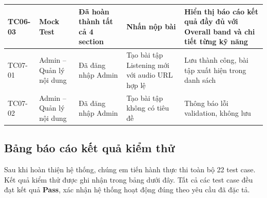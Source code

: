 \documentclass[a4paper,12pt]{extreport}
\begin{document}
\begin{longtable}{|p{1.3cm}|p{2.8cm}|p{2.8cm}|p{4.0cm}|p{3.0cm}|}
    TC06-03 & Mock Test & Đã hoàn thành tất cả 4 section & Nhấn nộp bài & Hiển thị báo cáo kết quả đầy đủ với Overall band và chi tiết từng kỹ năng \\ \hline

    TC07-01 & Admin -- Quản lý nội dung & Đã đăng nhập Admin & Tạo bài tập Listening mới với audio URL hợp lệ & Lưu thành công, bài tập xuất hiện trong danh sách \\ \hline

    TC07-02 & Admin -- Quản lý nội dung & Đã đăng nhập Admin & Tạo bài tập không có tiêu đề & Thông báo lỗi validation, không lưu \\ \hline

\end{longtable}

\subsection{Bảng báo cáo kết quả kiểm thử}

Sau khi hoàn thiện hệ thống, chúng em tiến hành thực thi toàn bộ 22 test case. Kết quả kiểm thử được ghi nhận trong bảng dưới đây. Tất cả các test case đều đạt kết quả \textbf{Pass}, xác nhận hệ thống hoạt động đúng theo yêu cầu đã đặc tả.
\end{document}
